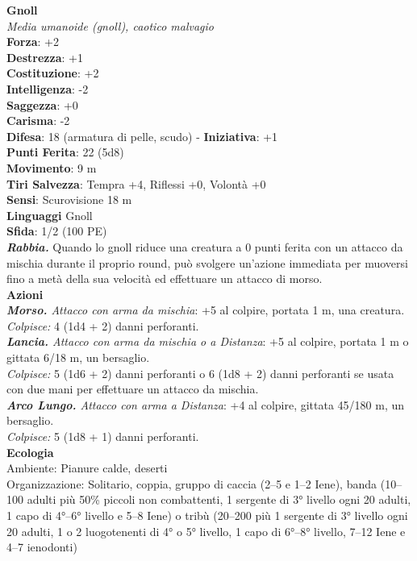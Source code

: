 \begin{multicols}{2}
\medskip\textbf{Gnoll}\\
\emph{Media umanoide (gnoll), caotico malvagio}\\
\textbf{Forza}: +2\\
\textbf{Destrezza}: +1\\
\textbf{Costituzione}: +2\\
\textbf{Intelligenza}: -2\\
\textbf{Saggezza}: +0\\
\textbf{Carisma}: -2\\
\textbf{Difesa}: 18 (armatura di pelle, scudo) - \textbf{Iniziativa}: +1\\
\textbf{Punti Ferita}: 22 (5d8)\\
\textbf{Movimento}: 9 m\\
\textbf{Tiri Salvezza}: Tempra +4, Riflessi +0, Volontà +0\\
\textbf{Sensi}: Scurovisione 18 m\\
\textbf{Linguaggi} Gnoll\\
\textbf{Sfida}: 1/2 (100 PE)\smallskip\\
\emph{\textbf{Rabbia.}} Quando lo gnoll riduce una creatura a 0 punti ferita con un attacco da mischia durante il proprio round, può svolgere un'azione immediata per muoversi fino a metà della sua velocità ed effettuare un attacco di morso.\\
\smallskip\textbf{Azioni}\\
\emph{\textbf{Morso.} Attacco con arma da mischia}: +5 al colpire, portata 1 m, una creatura.\\
\emph{Colpisce:} 4 (1d4 + 2) danni perforanti.\\
\emph{\textbf{Lancia.} Attacco con arma da mischia o a Distanza}: +5 al colpire, portata 1 m o gittata 6/18 m, un bersaglio.\\
\emph{Colpisce:} 5 (1d6 + 2) danni perforanti o 6 (1d8 + 2) danni perforanti se usata con due mani per effettuare un attacco da mischia.\\
\emph{\textbf{Arco Lungo.} Attacco con arma a Distanza}: +4 al colpire, gittata 45/180 m, un bersaglio.\\
\emph{Colpisce:} 5 (1d8 + 1) danni perforanti.\\
\textbf{Ecologia}\\
Ambiente: Pianure calde, deserti\\
Organizzazione: Solitario, coppia, gruppo di caccia (2–5 e 1–2 Iene), banda (10–100 adulti più 50\% piccoli non combattenti, 1 sergente di 3° livello ogni 20 adulti, 1 capo di 4°–6° livello e 5–8 Iene) o tribù (20–200 più 1 sergente di 3° livello ogni 20 adulti, 1 o 2 luogotenenti di 4° o 5° livello, 1 capo di 6°–8° livello, 7–12 Iene e 4–7 ienodonti)\\

\end{multicols}
